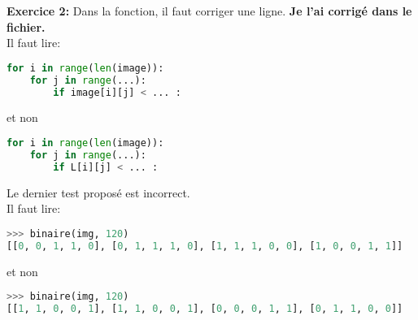 \documentclass[a4paper,11pt]{article}
\begin{document}
\noindent\textbf{Exercice 2:}
Dans la fonction, il faut corriger une ligne. \textbf{Je l'ai corrigé dans le fichier.}\\Il faut lire:
\begin{lstlisting}[language=Python  , xleftmargin=2em, xrightmargin=2em]
for i in range(len(image)):
    for j in range(...):
        if image[i][j] < ... :
\end{lstlisting}
et non
\begin{lstlisting}[language=Python  , xleftmargin=2em, xrightmargin=2em]
for i in range(len(image)):
    for j in range(...):
        if L[i][j] < ... :
\end{lstlisting}
Le dernier test proposé est incorrect. \\Il faut lire:
\begin{lstlisting}[language=Python  , xleftmargin=2em, xrightmargin=2em]
>>> binaire(img, 120)
[[0, 0, 1, 1, 0], [0, 1, 1, 1, 0], [1, 1, 1, 0, 0], [1, 0, 0, 1, 1]]
\end{lstlisting}
et non
\begin{lstlisting}[language=Python  , xleftmargin=2em, xrightmargin=2em]
>>> binaire(img, 120)
[[1, 1, 0, 0, 1], [1, 1, 0, 0, 1], [0, 0, 0, 1, 1], [0, 1, 1, 0, 0]]
\end{lstlisting}
\end{document}
